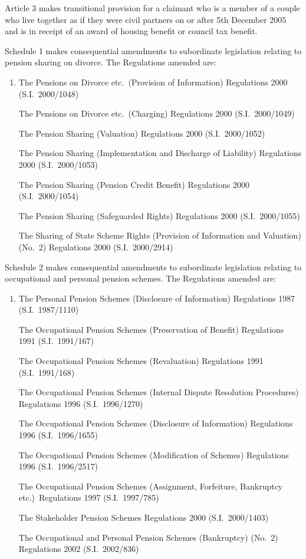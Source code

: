 \documentclass[12pt,a4paper]{article}
\begin{document}
Article 3 makes transitional provision for a claimant who is a member of a couple who live together as if they were civil partners on or after 5th December 2005 and is in receipt of an award of housing benefit or council tax benefit.

Schedule 1 makes consequential amendments to subordinate legislation relating to pension sharing on divorce. The Regulations amended are:
\begin{enumerate}\item[]
    The Pensions on Divorce etc.\ (Provision of Information) Regulations 2000 (S.I.\ 2000/1048)

    The Pensions on Divorce etc.\ (Charging) Regulations 2000 (S.I.\ 2000/1049)

    The Pension Sharing (Valuation) Regulations 2000 (S.I.\ 2000/1052)

    The Pension Sharing (Implementation and Discharge of Liability) Regulations 2000 (S.I.\ 2000/1053)

    The Pension Sharing (Pension Credit Benefit) Regulations 2000 (S.I.\ 2000/\hspace{0pt}1054)

    The Pension Sharing (Safeguarded Rights) Regulations 2000 (S.I.\ 2000/1055)

    The Sharing of State Scheme Rights (Provision of Information and Valuation) (No.\ 2) Regulations 2000 (S.I.\ 2000/2914) 
\end{enumerate}

Schedule 2 makes consequential amendments to subordinate legislation relating to occupational and personal pension schemes. The Regulations amended are:
\begin{enumerate}\item[]
    The Personal Pension Schemes (Disclosure of Information) Regulations 1987 (S.I.\ 1987/1110)

    The Occupational Pension Schemes (Preservation of Benefit) Regulations 1991 (S.I.\ 1991/167)

    The Occupational Pension Schemes (Revaluation) Regulations 1991 (S.I.\ 1991/168)

    The Occupational Pension Schemes (Internal Dispute Resolution Procedures) Regulations 1996 (S.I.\ 1996/1270)

    The Occupational Pension Schemes (Disclosure of Information) Regulations 1996 (S.I.\ 1996/1655)

    The Occupational Pension Schemes (Modification of Schemes) Regulations 1996 (S.I.\ 1996/2517)

    The Occupational Pension Schemes (Assignment, Forfeiture, Bankruptcy etc.)\ Regulations 1997 (S.I.\ 1997/785)

    The Stakeholder Pension Schemes Regulations 2000 (S.I.\ 2000/1403)

    The Occupational and Personal Pension Schemes (Bankruptcy) (No.\ 2) Regulations 2002 (S.I.\ 2002/836) 
\end{enumerate}
\end{document}
